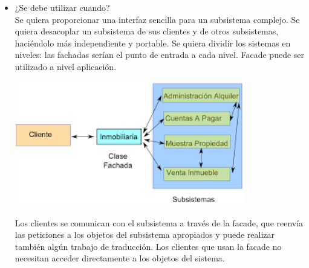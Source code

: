 \begin{flushleft}
\begin{itemize}
         \item ¿Se debe utilizar cuando?
	\\ Se quiera proporcionar una interfaz sencilla para un subsistema complejo.
             Se quiera desacoplar un subsistema de sus clientes y de otros subsistemas, haciéndolo más independiente y portable.
            Se quiera dividir los sistemas en niveles: las fachadas serían el punto de entrada a cada nivel. Facade puede ser utilizado a nivel aplicación.
	\begin{center}
	\includegraphics[width=10cm]{./Imagenes/facade3} 
	\end{center}

Los clientes se comunican con el subsistema a través de la facade, que reenvía las peticiones a los objetos del subsistema apropiados y puede realizar también algún trabajo de traducción. Los clientes que usan la facade no necesitan acceder directamente a los objetos del sistema.	
	

\end{itemize} 


\end{flushleft}